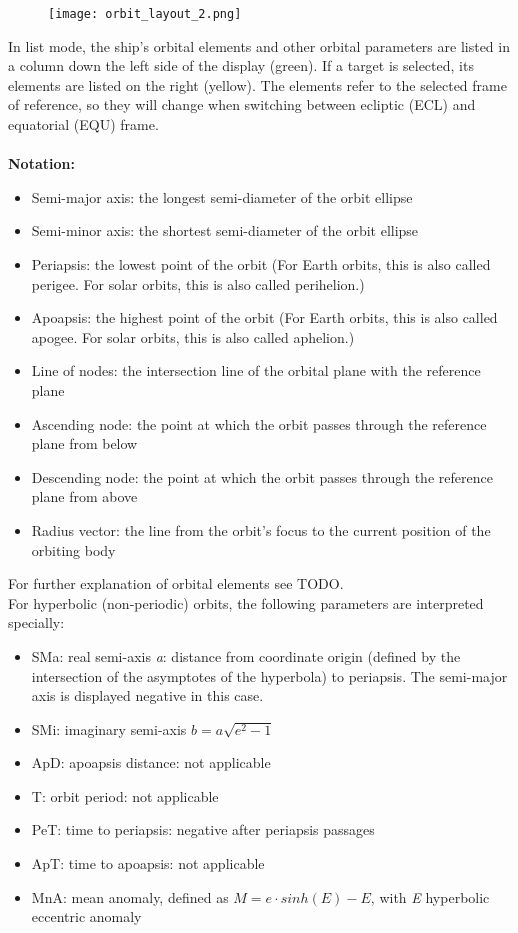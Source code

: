 \documentclass[Orbiter User Manual.tex]{subfiles}
\begin{document}
\begin{figure}[H]
  \centering
  \texttt{[image: orbit\_layout\_2.png]}
\end{figure}

\noindent
In list mode, the ship's orbital elements and other orbital parameters are listed in a column down the left side of the display (green). If a target is selected, its elements are listed on the right (yellow). The elements refer to the selected frame of reference, so they will change when switching between ecliptic (ECL) and equatorial (EQU) frame.\\
\\
\textbf{Notation:}

\begin{itemize}
\item Semi-major axis: the longest semi-diameter of the orbit ellipse
\item Semi-minor axis: the shortest semi-diameter of the orbit ellipse
\item Periapsis: the lowest point of the orbit (For Earth orbits, this is also called perigee. For solar orbits, this is also called perihelion.)
\item Apoapsis: the highest point of the orbit (For Earth orbits, this is also called apogee. For solar orbits, this is also called aphelion.)
\item Line of nodes: the intersection line of the orbital plane with the reference plane
\item Ascending node: the point at which the orbit passes through the reference plane from below
\item Descending node: the point at which the orbit passes through the reference plane from above
\item Radius vector: the line from the orbit's focus to the current position of the orbiting body
\end{itemize}

\noindent
For further explanation of orbital elements see TODO.\\
For hyperbolic (non-periodic) orbits, the following parameters are interpreted specially:

\begin{itemize}
\item SMa: real semi-axis \textit{a}: distance from coordinate origin (defined by the intersection of the asymptotes of the hyperbola) to periapsis. The semi-major axis is displayed negative in this case.
\item SMi: imaginary semi-axis $b = a \sqrt{e^{2} - 1}$
\item ApD: apoapsis distance: not applicable
\item T: orbit period: not applicable
\item PeT: time to periapsis: negative after periapsis passages
\item ApT: time to apoapsis: not applicable
\item MnA: mean anomaly, defined as $M = e \cdot sinh(E) - E$, with \textit{E} hyperbolic eccentric anomaly
\end{itemize}
\end{document}
